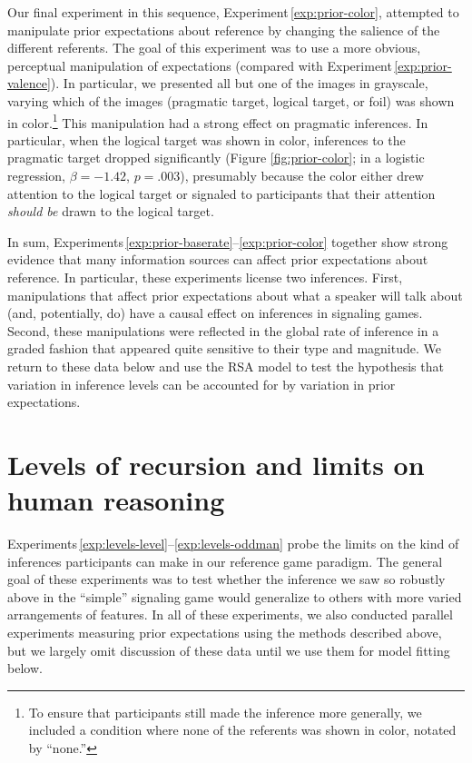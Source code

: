 \documentclass[man,noapacite]{apa2}
\newcounter{Experiment}
\newcommand{\exptref}[1]{Experiment\,\ref{#1}}
\newcommand{\exptrefrange}[2]{Experiments\,\ref{#1}--\ref{#2}}
\begin{document}
Our final experiment in this sequence, \exptref{exp:prior-color}, attempted to manipulate prior expectations about reference by changing the salience of the different referents. The goal of this experiment was to use a more obvious, perceptual manipulation of expectations (compared with \exptref{exp:prior-valence}). In particular, we presented all but one of the images in grayscale, varying which of the images (pragmatic target, logical target, or foil) was shown in color.\footnote{To ensure that participants still made the inference more generally, we included a condition where none of the referents was shown in color, notated by ``none.''} This manipulation had a strong effect on pragmatic inferences. In particular, when the logical target was shown in color, inferences to the pragmatic target dropped significantly (Figure \ref{fig:prior-color}; in a logistic regression, $\beta = -1.42$, $p = .003$), presumably because the color either drew attention to the logical target or signaled to participants that their attention \emph{should be} drawn to the logical target.

In sum, \exptrefrange{exp:prior-baserate}{exp:prior-color} together show strong evidence that many information sources can affect prior expectations about reference. In particular, these experiments license two inferences. First, manipulations that affect prior expectations about what a speaker will talk about (and, potentially, do) have a causal effect on inferences in signaling games. Second, these manipulations were reflected in the global rate of inference in a graded fashion that appeared quite sensitive to their type and magnitude. We return to these data below and use the RSA model to test the hypothesis that variation in inference levels can be accounted for by variation in prior expectations.

\section{Levels of recursion and limits on human reasoning}
\label{sec:levels}

\exptrefrange{exp:levels-level}{exp:levels-oddman} probe the limits on the kind of inferences participants can make in our reference game paradigm. The general goal of these experiments was to test whether the inference we saw so robustly above in the ``simple'' signaling game would generalize to others with more varied arrangements of features. In all of these experiments, we also conducted parallel experiments measuring prior expectations using the methods described above, but we largely omit discussion of these data until we use them for model fitting below.
\end{document}
